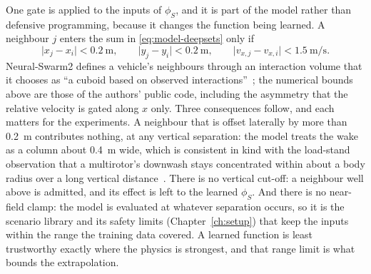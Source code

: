 One gate is applied to the inputs of $\phi_S$, and it is part of the model rather than defensive
programming, because it changes the function being learned. A neighbour $j$ enters the sum in
\eqref{eq:model-deepsets} only if
%
\begin{equation*}
  \lvert x_j - x_i \rvert < \SI{0.2}{\metre}, \qquad
  \lvert y_j - y_i \rvert < \SI{0.2}{\metre}, \qquad
  \lvert v_{x,j} - v_{x,i} \rvert < \SI{1.5}{\metre\per\second}.
\end{equation*}
%
Neural-Swarm2 defines a vehicle's neighbours through an interaction volume that it chooses as ``a
cuboid based on observed interactions''~\cite{shi2022neuralswarm2}; the numerical bounds above are
those of the authors' public code, including the asymmetry that the relative
velocity is gated along $x$ only. Three consequences follow, and each matters for the experiments.
A neighbour that is offset laterally by more than \SI{0.2}{\metre} contributes nothing, at any
vertical separation: the model treats the wake as a column about \SI{0.4}{\metre} wide, which is
consistent in kind with the load-stand observation that a multirotor's downwash stays concentrated
within about a body radius over a long vertical distance~\cite{gielis2023aggregate}.
There is no vertical cut-off: a neighbour well above is admitted, and its effect is left to the
learned $\phi_S$. And there is no near-field clamp: the model is evaluated at whatever separation
occurs, so it is the scenario library and its safety limits (Chapter~\ref{ch:setup}) that keep the
inputs within the range the training data covered. A learned function is least trustworthy exactly
where the physics is strongest, and that range limit is what bounds the extrapolation.

